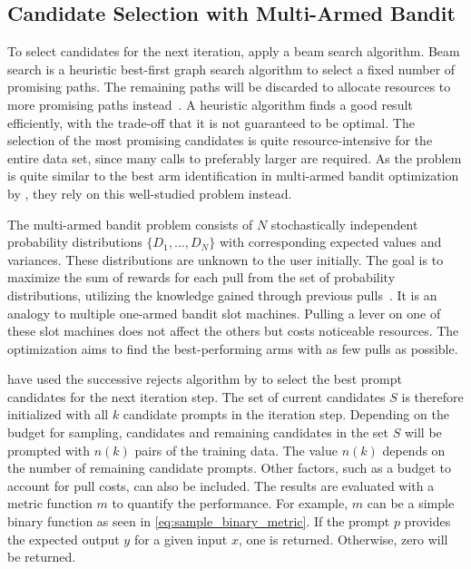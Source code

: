 \subsection{Candidate Selection with  Multi-Armed Bandit}
To select candidates for the next iteration, \citeauthor{pryzant2023AutomaticPrompt} apply a beam search algorithm.
Beam search is a heuristic best-first graph search algorithm to select a fixed number of promising paths.
The remaining paths will be discarded to allocate resources to more promising paths instead~\cite{BeamSearch}.
A heuristic algorithm finds a good result efficiently, with the trade-off that it is not guaranteed to be optimal.
The selection of the most promising candidates is quite resource-intensive for the entire data set, since many calls to preferably larger \LLMs are required.
As the problem is quite similar to the best arm identification in multi-armed bandit optimization by , they rely on this well-studied problem instead.

The multi-armed bandit problem consists of $N$ stochastically independent probability distributions $\{ D_1, \dots, D_N\}$ with corresponding expected values and variances.
These distributions are unknown to the user initially.
The goal is to maximize the sum of rewards for each pull from the set of probability distributions, utilizing the knowledge gained through previous pulls~\cite{kuleshov2014AlgorithmsMultiarmeda}.
It is an analogy to multiple one-armed bandit slot machines.
Pulling a lever on one of these slot machines does not affect the others but costs noticeable resources.
The optimization aims to find the best-performing arms with as few pulls as possible.

\citeauthor{pryzant2023AutomaticPrompt} have used the successive rejects algorithm by  to select the best prompt candidates for the next iteration step.
The set of current candidates $S$ is therefore initialized with all $k$ candidate prompts in the iteration step.
Depending on the budget for sampling, candidates and remaining candidates in the set $S$ will be prompted with $n(k)$ pairs of the training data.
The value $n(k)$ depends on the number of remaining candidate prompts.
Other factors, such as a budget to account for pull costs, can also be included.
The results are evaluated with a metric function $m$ to quantify the performance.
For example, $m$ can be a simple binary function as seen in \autoref{eq:sample_binary_metric}.
If the prompt $p$ provides the expected output $y$ for a given input $x$, one is returned.
Otherwise, zero will be returned.

